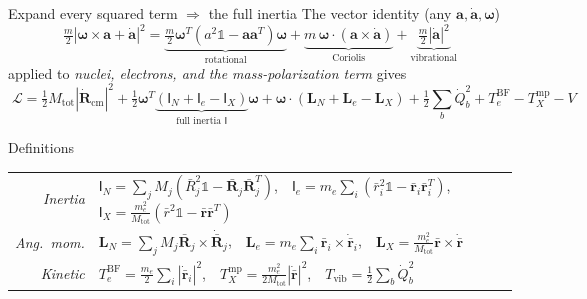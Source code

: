 \documentclass[aspectratio=169,10pt]{beamer}
\newcommand{\stagenum}{0}
\newcommand{\setstage}[1]{\renewcommand{\stagenum}{#1}}
\begin{document}
\begin{frame}{Expand every squared term $\Rightarrow$ the full inertia}
\setstage{2}
The vector identity (any $\mathbf a,\dot{\mathbf a},\boldsymbol\omega$)
\begin{equation*}
\tfrac{m}{2}|\boldsymbol{\omega}\!\times\!\mathbf{a}+\dot{\mathbf{a}}|^{2}
=\underbrace{\tfrac{m}{2}\boldsymbol{\omega}^{T}(a^{2}\mathbb{1}-\mathbf{a}\mathbf{a}^{T})\boldsymbol{\omega}}_{\text{rotational}}
+\underbrace{m\,\boldsymbol{\omega}\!\cdot\!(\mathbf{a}\!\times\!\dot{\mathbf{a}})}_{\text{Coriolis}}
+\underbrace{\tfrac{m}{2}|\dot{\mathbf{a}}|^{2}}_{\text{vibrational}} \tag{3.9c}
\end{equation*}
\vspace{-6pt}
applied to \emph{nuclei, electrons, and the mass-polarization term} gives
\begin{equation*}
\boxed{\;\mathcal L=\tfrac12 M_{\mathrm{tot}}|\dot{\mathbf R}_{\mathrm{cm}}|^2
+\tfrac12\boldsymbol\omega^{T}\underbrace{(\mathsf I_N+\mathsf I_e-\mathsf I_X)}_{\text{full inertia }\mathsf I}\boldsymbol\omega
+\boldsymbol\omega\!\cdot\!(\mathbf L_N+\mathbf L_e-\mathbf L_X)
+\tfrac12\sum_b\dot Q_b^2+T_e^{\mathrm{BF}}-T_X^{\mathrm{mp}}-V\;}\tag{3.13$'$}
\end{equation*}
\vspace{-4pt}
\begin{block}{Definitions}
{\scriptsize\setlength{\arraycolsep}{2pt}
\begin{tabular}{@{}r@{\;\;}p{}@{}}
\emph{Inertia} & $\mathsf I_N=\sum_jM_j(\bar R_j^2\mathbb 1-\bar{\mathbf R}_j\bar{\mathbf R}_j^{T})$,\ \ $\mathsf I_e=m_e\sum_i(\bar r_i^2\mathbb 1-\bar{\mathbf r}_i\bar{\mathbf r}_i^{T})$,\ \ $\mathsf I_X=\tfrac{m_e^2}{M_{\mathrm{tot}}}(\bar r^2\mathbb 1-\bar{\mathbf r}\bar{\mathbf r}^{T})$ \\[1pt]
\emph{Ang.\ mom.} & $\mathbf L_N=\sum_jM_j\bar{\mathbf R}_j\!\times\!\dot{\bar{\mathbf R}}_j$,\ \ $\mathbf L_e=m_e\sum_i\bar{\mathbf r}_i\!\times\!\dot{\bar{\mathbf r}}_i$,\ \ $\mathbf L_X=\tfrac{m_e^2}{M_{\mathrm{tot}}}\bar{\mathbf r}\!\times\!\dot{\bar{\mathbf r}}$ \\[1pt]
\emph{Kinetic} & $T_e^{\mathrm{BF}}=\tfrac{m_e}{2}\sum_i|\dot{\bar{\mathbf r}}_i|^2$,\ \ $T_X^{\mathrm{mp}}=\tfrac{m_e^2}{2M_{\mathrm{tot}}}|\dot{\bar{\mathbf r}}|^2$,\ \ $T_{\mathrm{vib}}=\tfrac12\sum_b\dot Q_b^2$ \\
\end{tabular}}
\end{block}
\end{frame}
\end{document}
